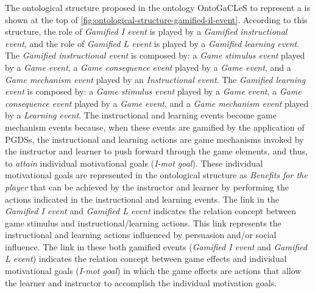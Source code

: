 The ontological structure proposed in the ontology OntoGaCLeS to represent a  is shown at the top of \autoref{fig:ontological-structure-gamified-il-event}.
According to this structure, the role of \emph{Gamified I event} is played by a \emph{Gamified instructional event}, and the role of \emph{Gamified L event} is played by a \emph{Gamified learning event}.
The \emph{Gamified instructional event} is composed by: a \emph{Game stimulus event} played by a \emph{Game event}, a \emph{Game consequence event} played by a \emph{Game event}, and a \emph{Game mechanism event} played by an \emph{Instructional event}.
The \emph{Gamified learning event} is composed by: a \emph{Game stimulus event} played by a \emph{Game event}, a \emph{Game consequence event} played by a \emph{Game event}, and a \emph{Game mechanism event} played by a \emph{Learning event}.
The instructional and learning events become game mechanism events because, when these events are gamified by the application of PGDSs, the instructional and learning actions are game mechanisms invoked by the instructor and learner to push forward through the game elements, and thus, to \emph{attain} individual motivational goals (\emph{I-mot goal}).
These individual motivational goals are represented in the ontological structure as \emph{Benefits for the player} that can be achieved by the instructor and learner by performing the actions indicated in the instructional and learning events.
The link  in the \emph{Gamified I event} and \emph{Gamified L event} indicates the relation concept between game stimulus and instructional/learning actions.
This link represents the instructional and learning actions influenced by persuasion and/or social influence.
The link  in these both gamified events (\emph{Gamified I event} and \emph{Gamified L event}) indicates the relation concept between game effects and individual motivational goals (\emph{I-mot goal}) in which the game effects are actions that allow the learner and instructor to accomplish the individual motivation goals.

